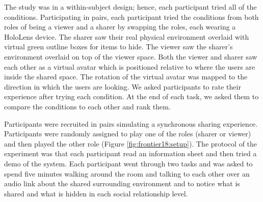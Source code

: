 The study was in a within-subject design; hence, each participant tried all of the conditions. Participating in pairs, each participant tried the conditions from both roles of being a viewer and a sharer by swapping the roles, each wearing a HoloLens device. The sharer saw their real physical environment overlaid with virtual green outline boxes for items to hide. The viewer saw the sharer's environment overlaid on top of the viewer space. Both the viewer and sharer saw each other as a virtual avatar which is positioned relative to where the users are inside the shared space. The rotation of the virtual avatar was mapped to the direction in which the users are looking. We asked participants to rate their experience after trying each condition. At the end of each task, we asked them to compare the conditions to each other and rank them. 


Participants were recruited in pairs simulating a synchronous sharing experience. Participants were randomly assigned to play one of the roles (sharer or viewer) and then played the other role (Figure \ref{fig:frontier18:setup}). The protocol of the experiment was that each participant read an information sheet and then tried a demo of the system. Each participant went through two tasks and was asked to spend five minutes walking around the room and talking to each other over an audio link about the shared surrounding environment and to notice what is shared and what is hidden in each social relationship level. 

